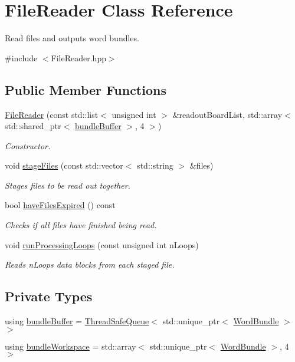 \hypertarget{class_file_reader}{}\section{File\+Reader Class Reference}
\label{class_file_reader}


Read files and outputs word bundles.  




{\ttfamily \#include $<$File\+Reader.\+hpp$>$}

\subsection*{Public Member Functions}
\begin{DoxyCompactItemize}
\item 
\hyperlink{class_file_reader_a3be44012f3dc81ad7943b1012b64e52d}{File\+Reader} (const std\+::list$<$ unsigned int $>$ \&readout\+Board\+List, std\+::array$<$ std\+::shared\+\_\+ptr$<$ \hyperlink{class_file_reader_ac755c1e271610c2c12a7fc5b55cc048b}{bundle\+Buffer} $>$, 4 $>$)
\begin{DoxyCompactList}\small\item\em Constructor. \end{DoxyCompactList}\item 
void \hyperlink{class_file_reader_a5d487d37857d537ace41c31d6594ef3a}{stage\+Files} (const std\+::vector$<$ std\+::string $>$ \&files)
\begin{DoxyCompactList}\small\item\em Stages files to be read out together. \end{DoxyCompactList}\item 
bool \hyperlink{class_file_reader_a58b80f2c9c2ec8381527bdfca1008007}{have\+Files\+Expired} () const
\begin{DoxyCompactList}\small\item\em Checks if all files have finished being read. \end{DoxyCompactList}\item 
void \hyperlink{class_file_reader_a478ed77f1b8f76e15cb2faa8964a26e6}{run\+Processing\+Loops} (const unsigned int n\+Loops)
\begin{DoxyCompactList}\small\item\em Reads n\+Loops data blocks from each staged file. \end{DoxyCompactList}\end{DoxyCompactItemize}
\subsection*{Private Types}
\begin{DoxyCompactItemize}
\item 
using \hyperlink{class_file_reader_ac755c1e271610c2c12a7fc5b55cc048b}{bundle\+Buffer} = \hyperlink{class_thread_safe_queue}{Thread\+Safe\+Queue}$<$ std\+::unique\+\_\+ptr$<$ \hyperlink{class_word_bundle}{Word\+Bundle} $>$ $>$
\item 
using \hyperlink{class_file_reader_a7fb625dc45cee3256d37cc19c65cad86}{bundle\+Workspace} = std\+::array$<$ std\+::unique\+\_\+ptr$<$ \hyperlink{class_word_bundle}{Word\+Bundle} $>$, 4 $>$
\end{DoxyCompactItemize}
